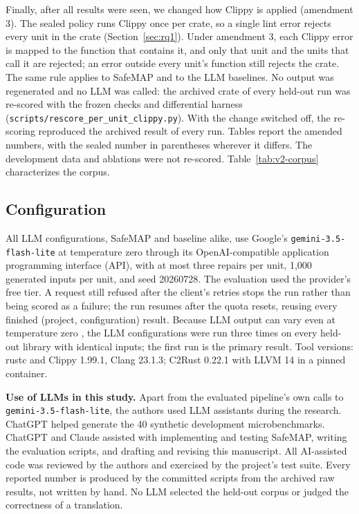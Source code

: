 \documentclass[pdflatex,sn-basic]{sn-jnl}
\newcommand{\tool}{SafeMAP\xspace}
\begin{document}
Finally, after all results were seen, we changed how Clippy is applied
(amendment 3). The sealed policy runs Clippy once per crate, so a single lint
error rejects every unit in the crate (Section~\ref{sec:rq1}). Under amendment
3, each Clippy error is mapped to the function that contains it, and only that
unit and the units that call it are rejected; an error outside every unit's
function still rejects the crate. The same rule applies to \tool and to the
LLM baselines. No output was regenerated and no LLM was called: the archived
crate of every held-out run was re-scored with the frozen checks and
differential harness (\texttt{scripts/rescore\_per\_unit\_clippy.py}). With the
change switched off, the re-scoring reproduced the archived result of every
run. Tables report the amended numbers, with the sealed number in parentheses
wherever it differs. The development data and ablations were not re-scored.
Table~\ref{tab:v2-corpus} characterizes the corpus.



\subsection{Configuration}

All LLM configurations, \tool and baseline alike, use Google's
\texttt{gemini-3.5-flash-lite} at temperature zero through its
OpenAI-compatible application programming interface (API), with at most three repairs per unit, 1,000 generated
inputs per unit, and seed 20260728. The evaluation used the provider's free
tier. A request still refused after the client's retries stops the run rather
than being scored as a failure; the run resumes after the quota resets, reusing
every finished (project, configuration) result. Because LLM output can vary
even at temperature zero \citep{ouyang2025nondeterminism}, the LLM configurations were run three times on every
held-out library with identical inputs; the first run is the primary result.
Tool versions: rustc and Clippy 1.99.1, Clang 23.1.3; C2Rust 0.22.1 with LLVM
14 in a pinned container.

\textbf{Use of LLMs in this study.} Apart from the evaluated pipeline's own
calls to \texttt{gemini-3.5-flash-lite}, the authors used LLM assistants during
the research. ChatGPT helped generate the 40 synthetic development
microbenchmarks. ChatGPT and Claude assisted with implementing and testing
\tool, writing the evaluation scripts, and drafting and revising this
manuscript. All AI-assisted code was reviewed by the authors and exercised by
the project's test suite. Every reported number is produced by the committed
scripts from the archived raw results, not written by hand. No LLM selected the
held-out corpus or judged the correctness of a translation.
\end{document}
